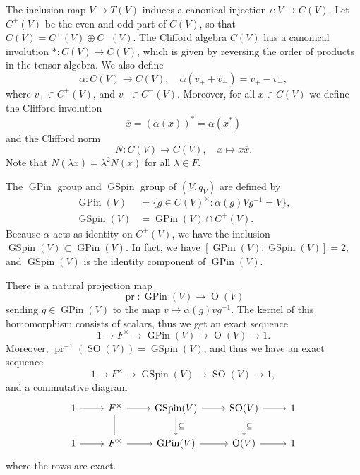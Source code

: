 \documentclass[12pt]{amsart}
\theoremstyle{remark}
\newcommand{\pr}{\operatorname{pr}}
\DeclareMathOperator{\SO}{SO}
\DeclareMathOperator{\GSpin}{GSpin}
\DeclareMathOperator{\GPin}{GPin}
\DeclareMathOperator{\Orth}{O}
\begin{document}
The inclusion map $V\to T(V)$ induces a canonical injection $\iota: V\to C(V)$. 
Let \( C^\pm(V) \) be the even and odd part of \( C(V) \), so that $C(V)=C^+(V)\oplus C^-(V)$. 
The Clifford algebra $C(V)$ has a canonical involution $*:C(V)\to C(V)$, which is given by reversing the order of products in the tensor algebra. 
We also define
\begin{equation*}
\alpha:C(V)\to C(V), \quad \alpha(v_{+}+v_{-})=v_{+}-v_{-}, 	
\end{equation*}
where $v_{+}\in C^{+}(V)$, and $v_{-}\in C^{-}(V)$. 
Moreover, for all $x\in C(V)$ we define the Clifford involution
\begin{equation*}
\overline{x}=(\alpha(x))^*=\alpha(x^*)
\end{equation*}
and the Clifford norm 
\begin{equation*}
N: C(V)\to C(V), \quad x\mapsto x \overline{x}.	
\end{equation*}
Note that $N(\lambda x)=\lambda^2 N(x)$ for all $\lambda\in F$.

 
The $\GPin$ group and $\GSpin$ group of $(V, q_V)$ are defined by
\begin{equation*}
\begin{split}
\GPin(V) &=\{g\in C(V)^\times: \alpha(g) V g^{-1}=V\},	\\
\GSpin(V) &=\GPin(V)\cap C^{+}(V).
\end{split}
\end{equation*}
Because $\alpha$ acts as identity on $C^+(V)$, we have the inclusion $\GSpin(V)\subset \GPin(V)$. In fact, we have $[\GPin(V):\GSpin(V)]=2$, and $\GSpin(V)$ is the identity component of $\GPin(V)$. 


There is a natural projection map 
\begin{equation*}
\pr:\GPin(V)\to \Orth(V)	
\end{equation*} 
sending $g\in \GPin(V)$ to the map $v\mapsto \alpha(g)vg^{-1}$. 
 The kernel of this homomorphism consists of scalars, thus we get an exact sequence
\begin{equation*}
1\to F^\times \to \GPin(V)\to \Orth(V)\to 1.	
\end{equation*} 
Moreover, $\pr^{-1}(\SO(V))=\GSpin(V)$, and thus we have an exact sequence
\begin{equation*}
1\to F^\times \to \GSpin(V)\to \SO(V)\to 1,	
\end{equation*} 
and
a commutative diagram
\[
\begin{tikzcd}
1 \ar[r] & F^\times \ar[r] \ar[d, equals] & \mathrm{GSpin}(V) \ar[r] \ar[d, "\subseteq"] & \mathrm{SO}(V) \ar[r] \ar[d, "\subseteq"] & 1 \\
1 \ar[r] & F^\times \ar[r] & \mathrm{GPin}(V) \ar[r] & \mathrm{O}(V) \ar[r] & 1
\end{tikzcd}
\]
where the rows are exact.  
\end{document}
